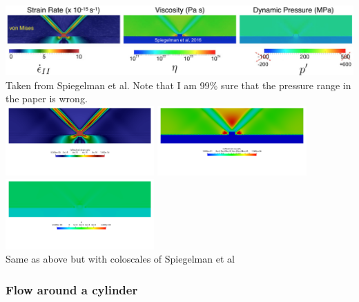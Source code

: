 \begin{center}
\includegraphics[width=16cm]{python_codes/fieldstone_87/images/fig1}\\
\includegraphics[width=14cm]{python_codes/fieldstone_87/images/fig2}\\
{\captionfont Taken from Spiegelman et al. Note that I am 99\% sure that the pressure range in the paper is wrong.}\\
\includegraphics[width=5.7cm]{python_codes/fieldstone_87/results/experiment_10/meth3/sr2}
\includegraphics[width=5.7cm]{python_codes/fieldstone_87/results/experiment_10/meth3/eta2}
\includegraphics[width=5.7cm]{python_codes/fieldstone_87/results/experiment_10/meth3/press2}\\
{\captionfont Same as above but with coloscales of Spiegelman et al} 
\end{center}





\newpage
\subsubsection*{Flow around a cylinder}

